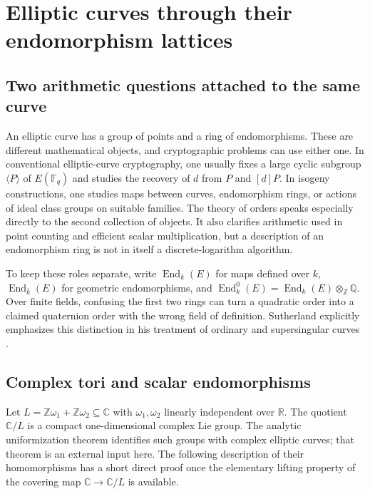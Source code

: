 \chapter{Elliptic curves through their endomorphism lattices}
\label{ch:elliptic-orders}

\section{Two arithmetic questions attached to the same curve}

An elliptic curve has a group of points and a ring of endomorphisms.
These are different mathematical objects, and cryptographic problems
can use either one. In conventional elliptic-curve cryptography, one
usually fixes a large cyclic subgroup $\langle P\rangle$ of
$E(\mathbb F_q)$ and studies the recovery of $d$ from $P$ and
$[d]P$. In isogeny constructions, one studies maps between curves,
endomorphism rings, or actions of ideal class groups on suitable
families. The theory of orders speaks especially directly to the
second collection of objects. It also clarifies arithmetic used in
point counting and efficient scalar multiplication, but a description
of an endomorphism ring is not in itself a discrete-logarithm algorithm.

To keep these roles separate, write
$\operatorname{End}_{k}(E)$ for maps defined over $k$,
$\operatorname{End}_{\bar k}(E)$ for geometric endomorphisms,
and $\operatorname{End}^{0}_{k}(E)=
\operatorname{End}_{k}(E)\otimes_{\mathbb Z}\mathbb Q$.
Over finite fields, confusing the first two rings can turn a
quadratic order into a claimed quaternion order with the wrong
field of definition. Sutherland explicitly emphasizes this
distinction in his treatment of ordinary and supersingular curves
\cite{Sutherland2023Ordinary}.

\section{Complex tori and scalar endomorphisms}

Let $L=\mathbb Z\omega_1+\mathbb Z\omega_2\subseteq\mathbb C$
with $\omega_1,\omega_2$ linearly independent over $\mathbb R$.
The quotient $\mathbb C/L$ is a compact one-dimensional complex
Lie group. The analytic uniformization theorem identifies such
groups with complex elliptic curves; that theorem is an external
input here. The following description of their homomorphisms has
a short direct proof once the elementary lifting property of the
covering map $\mathbb C\to\mathbb C/L$ is available.

